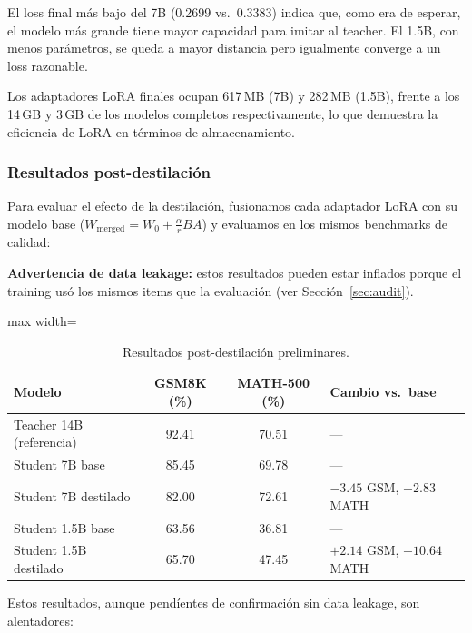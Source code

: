 \documentclass[11pt,a4paper]{article}
\begin{document}
El loss final m\'as bajo del 7B (0.2699 vs.\ 0.3383) indica que, como
era de esperar, el modelo m\'as grande tiene mayor capacidad para
imitar al teacher. El 1.5B, con menos par\'ametros, se queda a mayor
distancia pero igualmente converge a un loss razonable.

Los adaptadores LoRA finales ocupan 617\,MB (7B) y 282\,MB (1.5B),
frente a los 14\,GB y 3\,GB de los modelos completos respectivamente,
lo que demuestra la eficiencia de LoRA en t\'erminos de almacenamiento.

\subsubsection{Resultados post-destilaci\'on}

Para evaluar el efecto de la destilaci\'on, fusionamos cada adaptador
LoRA con su modelo base ($W_\text{merged} = W_0 + \frac{\alpha}{r}BA$)
y evaluamos en los mismos benchmarks de calidad:

\begin{warningbox}
\textbf{Advertencia de data leakage:} estos resultados pueden estar
inflados porque el training us\'o los mismos items que la evaluaci\'on
(ver Secci\'on~\ref{sec:audit}).
\end{warningbox}

\begin{table}[H]
\centering
\caption{Resultados post-destilaci\'on preliminares.}
\label{tab:prelim-postdistill}
\begin{adjustbox}{max width=\textwidth}
\begin{tabular}{@{}lccl@{}}
\toprule
\textbf{Modelo} & \textbf{GSM8K (\%)} & \textbf{MATH-500 (\%)}
    & \textbf{Cambio vs.\ base} \\
\midrule
Teacher 14B (referencia) & 92.41 & 70.51 & --- \\
\midrule
Student 7B base          & 85.45 & 69.78 & --- \\
\rowcolor{yellow!15}
Student 7B destilado     & 82.00 & 72.61 & $-3.45$ GSM, $+2.83$ MATH \\
\midrule
Student 1.5B base        & 63.56 & 36.81 & --- \\
\rowcolor{yellow!15}
Student 1.5B destilado   & 65.70 & 47.45 & $+2.14$ GSM, $+10.64$ MATH \\
\bottomrule
\end{tabular}
\end{adjustbox}
\end{table}

Estos resultados, aunque pend\'ientes de confirmaci\'on sin data
leakage, son alentadores:
\end{document}
